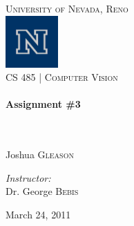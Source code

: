 \begin{titlepage}
\begin{center}

\textsc{\LARGE University of Nevada, Reno}\\[.5cm]
\includegraphics[width=0.15\textwidth]{./logo.png}\\[.5cm]

\textsc{\large CS 485 | Computer Vision } \\[.5cm]

\HRule \\[0.4cm]
{ \huge \bfseries Assignment \#3}\\[0.4cm]

\HRule \\[1.5cm]

\begin{minipage}{0.4\textwidth}
\begin{flushleft} \large
\emph{}\\
    Joshua \textsc{Gleason}\\
    \end{flushleft}
    \end{minipage}
    \begin{minipage}{0.4\textwidth}
    \begin{flushright} \large
    \emph{Instructor:} \\
      Dr. George \textsc{Bebis}
      \end{flushright}
      \end{minipage}

      \vspace*{\fill}

      

      \vspace*{\fill}

{\large March 24, 2011}

\end{center}

\end{titlepage}

